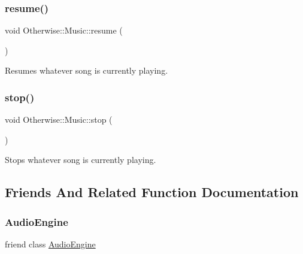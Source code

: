 \subsubsection{\texorpdfstring{resume()}{resume()}}
{\footnotesize\ttfamily void Otherwise\+::\+Music\+::resume (\begin{DoxyParamCaption}{ }\end{DoxyParamCaption})\hspace{0.3cm}{\ttfamily [static]}}



Resumes whatever song is currently playing. 

\mbox{\label{class_otherwise_1_1_music_a31706d4346de50bf724da0157485d8bf}} 
\subsubsection{\texorpdfstring{stop()}{stop()}}
{\footnotesize\ttfamily void Otherwise\+::\+Music\+::stop (\begin{DoxyParamCaption}{ }\end{DoxyParamCaption})\hspace{0.3cm}{\ttfamily [static]}}



Stops whatever song is currently playing. 



\subsection{Friends And Related Function Documentation}
\mbox{\label{class_otherwise_1_1_music_a234a96133b0b1dbaf4181626861f7c4a}} 
\subsubsection{\texorpdfstring{Audio\+Engine}{AudioEngine}}
{\footnotesize\ttfamily friend class \hyperlink{class_otherwise_1_1_audio_engine}{Audio\+Engine}\hspace{0.3cm}{\ttfamily [friend]}}



